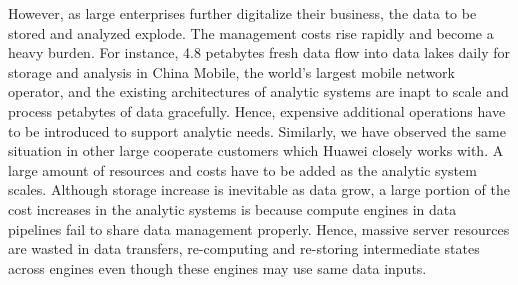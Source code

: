 However, as large enterprises further digitalize their business, the data to be stored and analyzed explode. The management costs rise rapidly and become a heavy burden. For instance, 4.8 petabytes fresh data flow into data lakes daily for storage and analysis in China Mobile, the world's largest mobile network operator, and the existing architectures of analytic systems are inapt to scale and process petabytes of data gracefully. Hence, expensive additional operations have to be introduced to support analytic needs. Similarly, we have observed the same situation in other large cooperate customers which Huawei closely works with. A large amount of resources and costs have to be added as the analytic system scales. Although storage increase is inevitable as data grow, a large portion of the cost increases in the analytic systems is because compute engines in data pipelines fail to share data management properly. Hence, massive server resources are wasted in data transfers, re-computing and re-storing intermediate states across engines even though these engines may use same data inputs.



